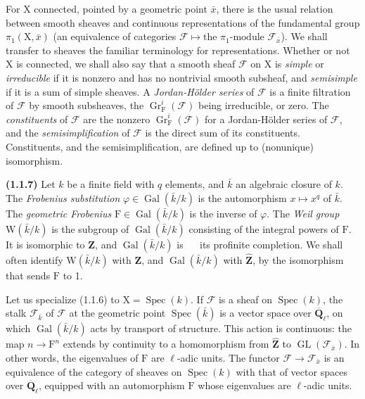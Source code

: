 \documentclass[11pt,leqno]{article}
\newcommand{\Page}[1]{\ifvmode\noindent\else\unskip\ \fi{\footnotesize\textcolor{gray}{[p.\,#1]}}\ \ignorespaces}
\begin{document}
For \(\mathrm{X}\) connected, pointed by a geometric point \(\bar x\), there is the usual relation between smooth sheaves and continuous representations of the fundamental group \(\pi_1(\mathrm{X},\bar x)\) (an equivalence of categories \(\mathscr{F}\mapsto\text{the }\pi_1\text{-module }\mathscr{F}_{\bar x}\)). We shall transfer to sheaves the familiar terminology for representations. Whether or not \(\mathrm{X}\) is connected, we shall also say that a smooth sheaf \(\mathscr{F}\) on \(\mathrm{X}\) is \textit{simple} or \textit{irreducible} if it is nonzero and has no nontrivial smooth subsheaf, and \textit{semisimple} if it is a sum of simple sheaves. A \textit{Jordan-Hölder series} of \(\mathscr{F}\) is a finite filtration of \(\mathscr{F}\) by smooth subsheaves, the \(\operatorname{Gr}_{\mathrm{F}}^i(\mathscr{F})\) being irreducible, or zero. The \textit{constituents} of \(\mathscr{F}\) are the nonzero \(\operatorname{Gr}_{\mathrm{F}}^i(\mathscr{F})\) for a Jordan-Hölder series of \(\mathscr{F}\), and the \textit{semisimplification} of \(\mathscr{F}\) is the direct sum of its constituents. Constituents, and the semisimplification, are defined up to (nonunique) isomorphism.

\textbf{(1.1.7)} Let \(k\) be a finite field with \(q\) elements, and \(\bar k\) an algebraic closure of \(k\). The \textit{Frobenius substitution} \(\varphi\in\operatorname{Gal}(\bar k/k)\) is the automorphism \(x\mapsto x^q\) of \(\bar k\). The \textit{geometric Frobenius} \(\mathrm{F}\in\operatorname{Gal}(\bar k/k)\) is the inverse of \(\varphi\). The \textit{Weil group} \(\mathrm{W}(\bar k/k)\) is the subgroup of \(\operatorname{Gal}(\bar k/k)\) consisting of the integral powers of \(\mathrm{F}\). It is isomorphic to \(\mathbf{Z}\), and \(\operatorname{Gal}(\bar k/k)\) is \Page{151}
its profinite completion. We shall often identify \(\mathrm{W}(\bar k/k)\) with \(\mathbf{Z}\), and \(\operatorname{Gal}(\bar k/k)\) with \(\widehat{\mathbf{Z}}\), by the isomorphism that sends \(\mathrm{F}\) to 1.

Let us specialize (1.1.6) to \(\mathrm{X}=\operatorname{Spec}(k)\). If \(\mathscr{F}\) is a sheaf on \(\operatorname{Spec}(k)\), the stalk \(\mathscr{F}_{\bar k}\) of \(\mathscr{F}\) at the geometric point \(\operatorname{Spec}(\bar k)\) is a vector space over \(\overline{\mathbf{Q}}_\ell\), on which \(\operatorname{Gal}(\bar k/k)\) acts by transport of structure. This action is continuous: the map \(n\to\mathrm{F}^n\) extends by continuity to a homomorphism from \(\widehat{\mathbf{Z}}\) to \(\operatorname{GL}(\mathscr{F}_{\bar x})\). In other words, the eigenvalues of \(\mathrm{F}\) are \(\ell\)-adic units. The functor \(\mathscr{F}\to\mathscr{F}_{\bar x}\) is an equivalence of the category of sheaves on \(\operatorname{Spec}(k)\) with that of vector spaces over \(\overline{\mathbf{Q}}_\ell\), equipped with an automorphism \(\mathrm{F}\) whose eigenvalues are \(\ell\)-adic units.
\end{document}
